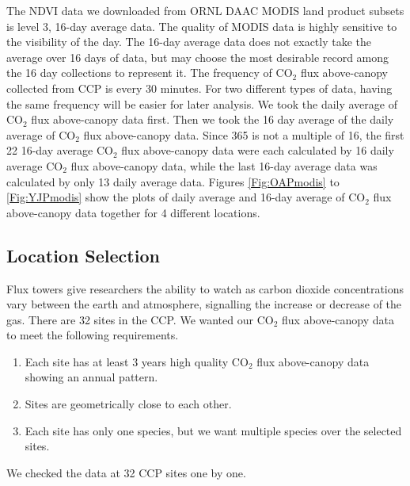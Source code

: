 \documentclass{article}\usepackage[]{graphicx}\usepackage[]{color}
\begin{document}
The NDVI data we downloaded from ORNL DAAC MODIS land product subsets is level 3, 16-day average data. The quality of MODIS data is highly sensitive to the visibility of the day. The 16-day average data does not exactly take the average over 16 days of data, but may choose the most desirable record among the 16 day collections to represent it. 
The frequency of CO$_2$ flux above-canopy collected from CCP is every 30 minutes. For two different types of data, having the same frequency will be easier for later analysis. We took the daily average of CO$_2$ flux above-canopy data first. Then we took the 16 day average of the daily average of CO$_2$ flux above-canopy data. Since 365 is not a multiple of 16, the first 22 16-day average CO$_2$ flux above-canopy data were each calculated by 16 daily average CO$_2$ flux above-canopy data, while the last 16-day average data was calculated by only 13 daily average data. Figures \ref{Fig:OAPmodis} to \ref{Fig:YJPmodis} show the plots of daily average and 16-day average of CO$_2$ flux above-canopy data together for 4 different locations.

\subsection{Location Selection}

Flux towers give researchers the ability to watch as carbon dioxide concentrations vary between the earth and atmosphere, signalling the increase or decrease of the gas.
There are 32 sites in the CCP. We wanted our CO$_2$ flux above-canopy data to meet the following requirements.

\begin{enumerate}
\item Each site has at least 3 years high quality CO$_2$ flux above-canopy data showing an annual pattern.
\item Sites are geometrically close to each other.
\item Each site has only one species, but we want multiple species over the selected sites.
\end{enumerate}

We checked the data at 32 CCP sites one by one.
\end{document}
